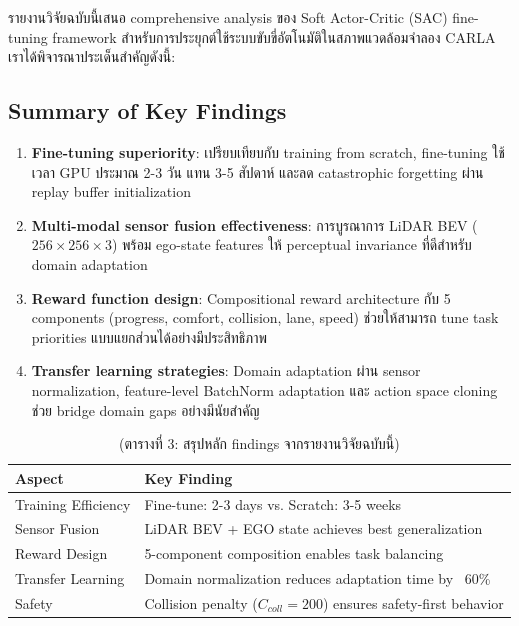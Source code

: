 \documentclass[10pt,a4paper,twocolumn]{article}
\begin{document}
รายงานวิจัยฉบับนี้เสนอ comprehensive analysis ของ Soft Actor-Critic (SAC) fine-tuning framework สำหรับการประยุกต์ใช้ระบบขับขี่อัตโนมัติในสภาพแวดล้อมจำลอง CARLA เราได้พิจารณาประเด็นสำคัญดังนี้:

\subsection{Summary of Key Findings}

\begin{enumerate}
    \item \textbf{Fine-tuning superiority}: เปรียบเทียบกับ training from scratch, fine-tuning ใช้เวลา GPU ประมาณ 2-3 วัน แทน 3-5 สัปดาห์ และลด catastrophic forgetting ผ่าน replay buffer initialization
    
    \item \textbf{Multi-modal sensor fusion effectiveness}: การบูรณาการ LiDAR BEV ($256\times256\times3$) พร้อม ego-state features ให้ perceptual invariance ที่ดีสำหรับ domain adaptation
    
    \item \textbf{Reward function design}: Compositional reward architecture กับ 5 components (progress, comfort, collision, lane, speed) ช่วยให้สามารถ tune task priorities แบบแยกส่วนได้อย่างมีประสิทธิภาพ
    
    \item \textbf{Transfer learning strategies}: Domain adaptation ผ่าน sensor normalization, feature-level BatchNorm adaptation และ action space cloning ช่วย bridge domain gaps อย่างมีนัยสำคัญ
\end{enumerate}

\begin{table}[h!]
    \centering
    \caption*{(ตารางที่ 3: สรุปหลัก findings จากรายงานวิจัยฉบับนี้)}
    \label{tab:key-findings}
    \begin{tabular}{ll}
        \toprule
        \textbf{Aspect} & \textbf{Key Finding} \\
        \midrule
        Training Efficiency & Fine-tune: 2-3 days vs. Scratch: 3-5 weeks \\
        Sensor Fusion & LiDAR BEV + EGO state achieves best generalization \\
        Reward Design & 5-component composition enables task balancing \\
        Transfer Learning & Domain normalization reduces adaptation time by ~60\% \\
        Safety & Collision penalty ($C_{coll}=200$) ensures safety-first behavior \\
        \bottomrule
    \end{tabular}
\end{table}
\end{document}
